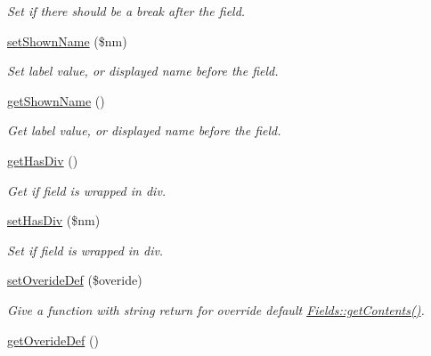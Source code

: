 \begin{DoxyCompactItemize}
\begin{DoxyCompactList}\small\item\em Set if there should be a break after the field. \end{DoxyCompactList}\item 
\hyperlink{class_fields_af349b62dcfca9af90e20bd0b2766ce5e}{set\-Shown\-Name} (\$nm)
\begin{DoxyCompactList}\small\item\em Set label value, or displayed name before the field. \end{DoxyCompactList}\item 
\hyperlink{class_fields_aa377fa79244ee3146a650fcff9d709e4}{get\-Shown\-Name} ()
\begin{DoxyCompactList}\small\item\em Get label value, or displayed name before the field. \end{DoxyCompactList}\item 
\hypertarget{class_fields_a765e454543169586ea855cde5dd64129}{\hyperlink{class_fields_a765e454543169586ea855cde5dd64129}{get\-Has\-Div} ()}\label{class_fields_a765e454543169586ea855cde5dd64129}

\begin{DoxyCompactList}\small\item\em Get if field is wrapped in div. \end{DoxyCompactList}\item 
\hypertarget{class_fields_a7cf09e8ea450f02764ad51475f5eccf3}{\hyperlink{class_fields_a7cf09e8ea450f02764ad51475f5eccf3}{set\-Has\-Div} (\$nm)}\label{class_fields_a7cf09e8ea450f02764ad51475f5eccf3}

\begin{DoxyCompactList}\small\item\em Set if field is wrapped in div. \end{DoxyCompactList}\item 
\hyperlink{class_fields_a013b668cd0771a560d9f8dd061badb82}{set\-Overide\-Def} (\$overide)
\begin{DoxyCompactList}\small\item\em Give a function with string return for override default \hyperlink{class_fields_a14814e04b348120748912692645f3a75}{Fields\-::get\-Contents()}. \end{DoxyCompactList}\item 
\hypertarget{class_fields_a0698530a58faba482d4d427815d7d2af}{\hyperlink{class_fields_a0698530a58faba482d4d427815d7d2af}{get\-Overide\-Def} ()}\label{class_fields_a0698530a58faba482d4d427815d7d2af}


\end{DoxyCompactItemize}
